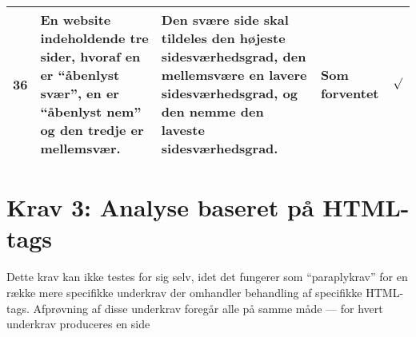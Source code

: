 \documentclass[a4paper,oneside,article]{memoir}
\begin{document}
\begin{landscape}
\begin{longtable}[c]{p{20pt}|p{220pt}|p{130pt}|p{130pt}|r}
36 &
En website indeholdende tre sider, hvoraf en er ``åbenlyst svær'', en
er ``åbenlyst nem'' og den tredje er mellemsvær. &
Den svære side skal tildeles den højeste sidesværhedsgrad, den
mellemsvære en lavere sidesværhedsgrad, og den nemme den laveste
sidesværhedsgrad. &
Som forventet &
$\surd$ \\ \hline

\end{longtable}

\section{Krav 3: Analyse baseret på HTML-tags}

Dette krav kan ikke testes for sig selv, idet det fungerer som
``paraplykrav'' for en række mere specifikke underkrav der omhandler
behandling af specifikke HTML-tags. Afprøvning af disse underkrav
foregår alle på samme måde --- for hvert underkrav produceres en side
\end{landscape}
\end{document}
